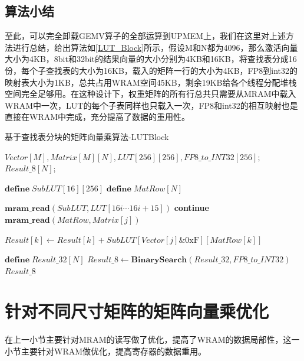\subsection{算法小结}
至此，可以完全卸载GEMV算子的全部运算到UPMEM上，我们在这里对上述方法进行总结，给出算法如\ref{LUT_Block}所示，假设M和N都为4096，那么激活向量大小为4KB，8bit和32bit的结果向量的大小分别为4KB和16KB，将查找表分成16份，每个子查找表的大小为16KB，载入的矩阵一行的大小为4KB，FP8到int32的映射表大小为1KB，总共占用WRAM空间45KB，剩余19KB给各个线程分配堆栈空间完全足够用。在这种设计下，权重矩阵的所有行总共只需要从MRAM中载入WRAM中一次，LUT的每个子表同样也只载入一次，FP8和int32的相互映射也是直接在WRAM中完成，充分提高了数据的重用性。

\begin{algorithm}[!ht]
    \caption{基于查找表分块的矩阵向量乘算法-LUTBlock}
    \label{LUT_Block}
    \begin{algorithmic}[1]
        \Require $Vector[M], Matrix[M][N], LUT[256][256], FP8\_to\_INT32[256]$; %
        \Ensure $Result\_8[N]$; %

        \State $\textbf{define}\; SubLUT[16][256]$
        \State $\textbf{define}\; MatRow[N]$

            \State $\textbf{mram\_read}(SubLUT, LUT[16i \cdots 16i + 15])$
            \Comment{\textcolor{blue}{parallel in 16 for each tasklet}}
                    \State \textbf{continue}
                \EndIf
                \State $\textbf{mram\_read}(MatRow, Matrix[j])$
                \Comment{\textcolor{blue}{parallel in N for each tasklet}}
                
                \Comment{\textcolor{blue}{parallel in N for each tasklet}}
                    \State $Result[k] \gets Result[k] + SubLUT[Vector[j] \& \text{0xF}][MatRow[k]]$
                \EndFor
            \EndFor
        \EndFor

        \State $\textbf{define}\; Result\_32[N]$
        \State $Result\_8 \gets \textbf{BinarySearch}(Result\_32, FP8\_to\_INT32)$
        \Comment{\textcolor{blue}{parallel in N for each tasklet}}
        \State \Return $Result\_8$
    \end{algorithmic}
\end{algorithm}

\section{针对不同尺寸矩阵的矩阵向量乘优化}
在上一小节主要针对MRAM的读写做了优化，提高了WRAM的数据局部性，这一小节主要针对WRAM做优化，提高寄存器的数据重用。

